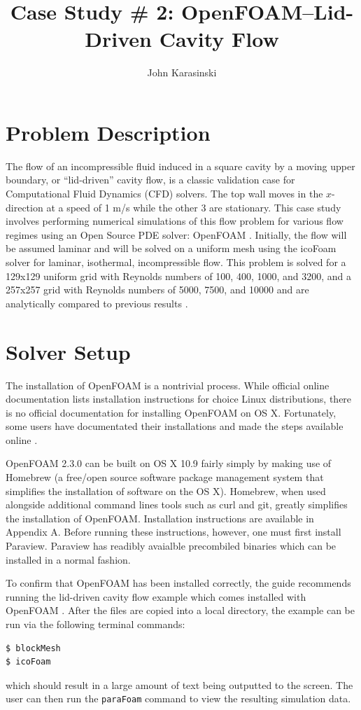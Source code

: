 \documentclass[twocolumn,10pt]{asme2ej}
\title{Case Study \# 2: OpenFOAM–Lid-Driven Cavity Flow}
\author{John Karasinski
    \affiliation{
  Graduate Student Researcher\\
  Center for Human/Robotics/Vehicle Integration and Performance\\
  Department of Mechanical and Aerospace Engineering\\
  University of California\\
  Davis, California 95616\\
    Email: karasinski@ucdavis.edu
    }
}
\begin{document}
\maketitle

\section{Problem Description}
The flow of an incompressible fluid induced in a square cavity by a moving upper boundary, or ``lid-driven'' cavity flow, is a classic validation case for Computational Fluid Dynamics (CFD) solvers. The top wall moves in the $x$-direction at a speed of 1 m/s while the other 3 are stationary. This case study involves performing numerical simulations of this flow problem for various flow regimes using an Open Source PDE solver: OpenFOAM \cite{jasak2007openfoam}. Initially, the flow will be assumed laminar and will be solved on a uniform mesh using the icoFoam solver for laminar, isothermal, incompressible flow. This problem is solved for a 129x129 uniform grid with Reynolds numbers of 100, 400, 1000, and 3200, and a 257x257 grid with Reynolds numbers of 5000, 7500, and 10000 and are analytically compared to previous results \cite{ghia1982high}.

\section{Solver Setup}
The installation of OpenFOAM is a nontrivial process. While official online documentation lists installation instructions for choice Linux distributions, there is no official documentation for installing OpenFOAM on OS X. Fortunately, some users have documentated their installations and made the steps available online \cite{ctfm_1}.

OpenFOAM 2.3.0 can be built on OS X 10.9 fairly simply by making use of Homebrew (a free/open source software package management system that simplifies the installation of software on the OS X). Homebrew, when used alongside additional command lines tools such as curl and git, greatly simplifies the installation of OpenFOAM. Installation instructions are available in Appendix A. Before running these instructions, however, one must first install Paraview. Paraview has readibly avaialble precombiled binaries which can be installed in a normal fashion.

To confirm that OpenFOAM has been installed correctly, the guide recommends running the lid-driven cavity flow example which comes installed with OpenFOAM \cite{ctfm_1}. After the files are copied into a local directory, the example can be run via the following terminal commands:
\begin{lstlisting}[language=sh]
$ blockMesh
$ icoFoam
\end{lstlisting}
which should result in a large amount of text being outputted to the screen. The user can then run the \lstinline[language=sh]`paraFoam` command to view the resulting simulation data.
\end{document}
